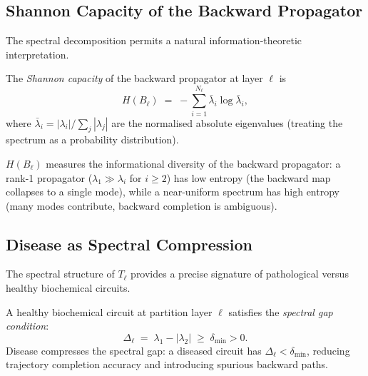\subsection{Shannon Capacity of the Backward Propagator}

The spectral decomposition  permits a natural
information-theoretic interpretation.

\begin{definition}
\label{def:ch05-bp-entropy}
The \emph{Shannon capacity} of the backward propagator at layer $\ell$ is
\begin{equation}
\label{eq:ch05-entropy}
    H(B_\ell) \;=\; -\sum_{i=1}^{N_\ell} \bar{\lambda}_i \log \bar{\lambda}_i,
\end{equation}
where $\bar{\lambda}_i = |\lambda_i| / \sum_j |\lambda_j|$ are the
normalised absolute eigenvalues (treating the spectrum as a probability
distribution).
\end{definition}

$H(B_\ell)$ measures the informational diversity of the backward propagator:
a rank-1 propagator ($\lambda_1 \gg \lambda_i$ for $i \geq 2$) has low
entropy (the backward map collapses to a single mode), while a near-uniform
spectrum has high entropy (many modes contribute, backward completion is
ambiguous).

\subsection{Disease as Spectral Compression}

The spectral structure of $T_\ell$ provides a precise signature of
pathological versus healthy biochemical circuits.

\begin{proposition}
\label{prop:ch05-healthy-gap}
A healthy biochemical circuit at partition layer $\ell$ satisfies the
\emph{spectral gap condition}:
\begin{equation}
\label{eq:ch05-gap-condition}
    \Delta_\ell \;=\; \lambda_1 - |\lambda_2| \;\geq\; \delta_{\min} > 0.
\end{equation}
Disease compresses the spectral gap: a diseased circuit has
$\Delta_\ell < \delta_{\min}$, reducing trajectory completion accuracy
and introducing spurious backward paths.
\end{proposition}

